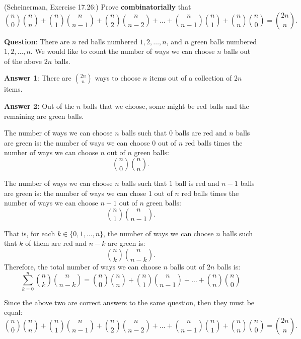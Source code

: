 \documentclass{article}
\theoremstyle{definition}
\begin{document}
\begin{question}
    (Scheinerman, Exercise 17.26:)
    Prove \textbf{combinatorially} that
    \[ \binom{n}{0}\binom{n}{n} + \binom{n}{1} \binom{n}{n-1} + \binom{n}{2}\binom{n}{n-2} + \ldots + \binom{n}{n-1}\binom{n}{1} + \binom{n}{n}\binom{n}{0} = \binom{2n}{n}. \]
\end{question}
\begin{solution}
\textbf{Question}: There are $n$ red balls numbered $1, 2, \ldots, n$, and $n$ green balls numbered $1, 2, \ldots, n$.  We would like to count the number of ways we can choose $n$ balls out of the above $2n$ balls.

\textbf{Answer 1}: There are $\binom{2n}{n}$ ways to choose $n$ items out of a collection of $2n$ items.

\textbf{Answer 2:} Out of the $n$ balls that we choose, some might be red balls and the remaining are green balls.

The number of ways we can choose $n$ balls such that $0$ balls are red and $n$ balls are green is: the number of ways we can choose 0 out of $n$ red balls times the number of ways we can choose $n$ out of $n$ green balls:
\[ \binom{n}{0} \binom{n}{n}.\]

The number of ways we can choose $n$ balls such that $1$ ball is red and $n-1$ balls are green is: the number of ways we can chose 1 out of $n$ red balls times the number of ways we can choose $n-1$ out of $n$ green balls:
\[ \binom{n}{1} \binom{n}{n-1}. \]

That is, for each $k \in \{0, 1, \ldots, n\}$, the number of ways we can choose $n$ balls such that $k$ of them are red and $n-k$ are green is:
\[ \binom{n}{k}\binom{n}{n-k}. \]
Therefore, the total number of ways we can choose $n$ balls out of $2n$ balls is:
\[ \sum_{k=0}^n \binom{n}{k}\binom{n}{n-k} = \binom{n}{0}\binom{n}{n} + \binom{n}{1} \binom{n}{n-1} + \ldots + \binom{n}{n}\binom{n}{0} \]


Since the above two are correct answers to the same question, then they must be equal:
\[ \binom{n}{0}\binom{n}{n} + \binom{n}{1} \binom{n}{n-1} + \binom{n}{2}\binom{n}{n-2} + \ldots + \binom{n}{n-1}\binom{n}{1} + \binom{n}{n}\binom{n}{0} = \binom{2n}{n}. \]
\end{solution}
\end{document}
